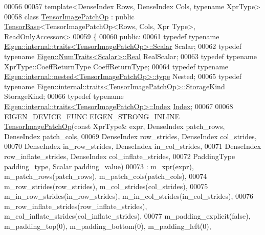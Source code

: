 \begin{DoxyCode}
00056 
00057 \textcolor{keyword}{template}<DenseIndex Rows, DenseIndex Cols, \textcolor{keyword}{typename} XprType>
00058 \textcolor{keyword}{class }\hyperlink{class_eigen_1_1_tensor_image_patch_op}{TensorImagePatchOp} : \textcolor{keyword}{public} \hyperlink{class_eigen_1_1_tensor_base}{TensorBase}<TensorImagePatchOp<Rows, Cols, Xpr
      Type>, ReadOnlyAccessors>
00059 \{
00060   \textcolor{keyword}{public}:
00061   \textcolor{keyword}{typedef} \textcolor{keyword}{typename} \hyperlink{struct_eigen_1_1internal_1_1traits}{Eigen::internal::traits<TensorImagePatchOp>::Scalar}
       Scalar;
00062   \textcolor{keyword}{typedef} \textcolor{keyword}{typename} \hyperlink{group___sparse_core___module}{Eigen::NumTraits<Scalar>::Real} RealScalar;
00063   \textcolor{keyword}{typedef} \textcolor{keyword}{typename} XprType::CoeffReturnType CoeffReturnType;
00064   \textcolor{keyword}{typedef} \textcolor{keyword}{typename} \hyperlink{class_eigen_1_1internal_1_1_tensor_lazy_evaluator_writable}{Eigen::internal::nested<TensorImagePatchOp>::type}
       Nested;
00065   \textcolor{keyword}{typedef} \textcolor{keyword}{typename} \hyperlink{struct_eigen_1_1internal_1_1traits}{Eigen::internal::traits<TensorImagePatchOp>::StorageKind}
       StorageKind;
00066   \textcolor{keyword}{typedef} \textcolor{keyword}{typename} \hyperlink{struct_eigen_1_1internal_1_1traits}{Eigen::internal::traits<TensorImagePatchOp>::Index}
       \hyperlink{namespace_eigen_a62e77e0933482dafde8fe197d9a2cfde}{Index};
00067 
00068   EIGEN\_DEVICE\_FUNC EIGEN\_STRONG\_INLINE \hyperlink{class_eigen_1_1_tensor_image_patch_op}{TensorImagePatchOp}(\textcolor{keyword}{const} XprType& expr, 
      DenseIndex patch\_rows, DenseIndex patch\_cols,
00069                                                            DenseIndex row\_strides, DenseIndex col\_strides,
00070                                                            DenseIndex in\_row\_strides, DenseIndex 
      in\_col\_strides,
00071                                                            DenseIndex row\_inflate\_strides, DenseIndex 
      col\_inflate\_strides,
00072                                                            PaddingType padding\_type, Scalar padding\_value)
00073       : m\_xpr(expr), m\_patch\_rows(patch\_rows), m\_patch\_cols(patch\_cols),
00074         m\_row\_strides(row\_strides), m\_col\_strides(col\_strides),
00075         m\_in\_row\_strides(in\_row\_strides), m\_in\_col\_strides(in\_col\_strides),
00076         m\_row\_inflate\_strides(row\_inflate\_strides), m\_col\_inflate\_strides(col\_inflate\_strides),
00077         m\_padding\_explicit(\textcolor{keyword}{false}), m\_padding\_top(0), m\_padding\_bottom(0), m\_padding\_left(0), 

\end{DoxyCode}
